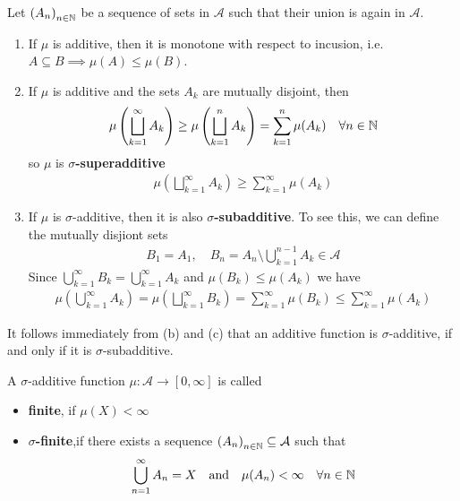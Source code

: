 \begin{rem}[]
  Let $\left(A_{n}\right)_{n \in \mathbb{N}}$ be a sequence of sets in $\mathcal{A}$ such that their union is again in $\mathcal{A}$.
\begin{enumerate}
  \item If $\mu$ is additive, then it is monotone with respect to incusion, i.e. $A \subseteq B \implies \mu(A) \leq \mu(B)$.
  \item If $\mu$ is additive and the sets $A_k$ are mutually disjoint, then
    \begin{align*}
        \mu \left(
          \bigsqcup_{k=1}^{\infty}A_k
        \right)
        \geq
        \mu \left(
          \bigsqcup_{k=1}^{n}A_k
        \right)
        = \sum_{k=1}^{n}\mu(A_k) \quad \forall n \in \mathbb{N}
    \end{align*}
    so $\mu$ is \textbf{$\sigma$-superadditive}
    \begin{align*}
      \mu\left(
        \bigsqcup_{k=1}^{\infty}A_k
      \right)
      \geq
      \sum_{k=1}^{\infty}\mu(A_k)
    \end{align*}
  \item If $\mu$ is $\sigma$-additive, then it is also \textbf{$\sigma$-subadditive}. 
    To see this, we can define the mutually disjiont sets
    \begin{align*}
      B_1 = A_1, \quad B_n = A_n \setminus \bigcup_{k=1}^{n-1}A_k \in \mathcal{A}
    \end{align*}
    Since $\bigcup_{k=1}^{\infty}B_k = \bigcup_{k=1}^{\infty}A_k$ and $\mu(B_k) \leq \mu(A_k)$ we have
    \begin{align*}
        \mu \left(
          \bigcup_{k=1}^{\infty}A_k
        \right)
        =
        \mu \left(
          \bigsqcup_{k=1}^{\infty}B_k
        \right)
        =
        \sum_{k=1}^{\infty}\mu(B_k)
        \leq
        \sum_{k=1}^{\infty}\mu(A_k)
    \end{align*}
\end{enumerate}
It follows immediately from (b) and (c) that an additive function is $\sigma$-additive, if and only if it is $\sigma$-subadditive.
\end{rem}

\begin{dfn}[]
  A $\sigma$-additive function $\mu: \mathcal{A} \to [0,\infty]$ is called
    \begin{itemize}
      \item \textbf{finite}, if $\mu(X) < \infty$
      \item \textbf{$\sigma$-finite},if there exists a sequence $\left(A_{n}\right)_{n \in \mathbb{N}} \subseteq \mathcal{A}$ such that
        \begin{align*}
          \bigcup_{n=1}^{\infty}A_n = X \quad \text{and} \quad \mu(A_n) < \infty \quad \forall n \in \mathbb{N}
        \end{align*}
    \end{itemize}
\end{dfn}


